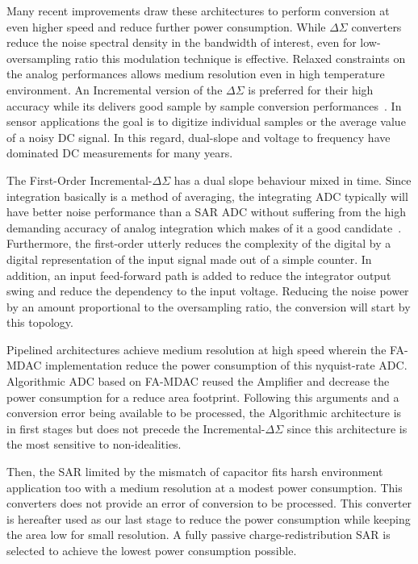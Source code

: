 Many recent improvements draw these architectures to perform conversion at even higher speed and reduce further power consumption. While \(\Delta\Sigma \) converters reduce the noise spectral density in the bandwidth of interest, even for low-oversampling ratio this modulation technique is effective. Relaxed constraints on the analog performances allows medium resolution even in high temperature environment. An Incremental version of the \(\Delta\Sigma \) is preferred for their high accuracy while its delivers good sample by sample conversion performances~\cite{Markus2004}. In sensor applications the goal is to digitize individual samples or the average value of a noisy DC signal. In this regard, dual-slope and voltage to frequency have dominated DC measurements for many years. 

The First-Order Incremental-\(\Delta\Sigma \) has a dual slope behaviour mixed in time. Since integration basically is a method of averaging, the integrating ADC typically will have better noise performance than a SAR ADC without suffering from the high demanding accuracy of analog integration which makes of it a good candidate~\cite{Markus2004, Caldwell2010}. Furthermore, the first-order utterly reduces the complexity of the digital by a digital representation of the input signal made out of a simple counter. In addition, an input feed-forward path is added to reduce the integrator output swing and reduce the dependency to the input voltage. Reducing the noise power by an amount proportional to the oversampling ratio, the conversion will start by this topology. 

Pipelined architectures achieve medium resolution at high speed wherein the FA-MDAC implementation reduce the power consumption of this nyquist-rate ADC\@. Algorithmic ADC based on FA-MDAC reused the Amplifier and decrease the power consumption for a reduce area footprint. Following this arguments and a conversion error being available to be processed, the Algorithmic architecture is in first stages but does not precede the Incremental-\(\Delta\Sigma \) since this architecture is the most sensitive to non-idealities.

Then, the SAR limited by the mismatch of capacitor fits harsh environment application too with a medium resolution at a modest power consumption. This converters does not provide an error of conversion to be processed. This converter is hereafter used as our last stage to reduce the power consumption while keeping the area low for small resolution. A fully passive charge-redistribution SAR is selected to achieve the lowest power consumption possible.

